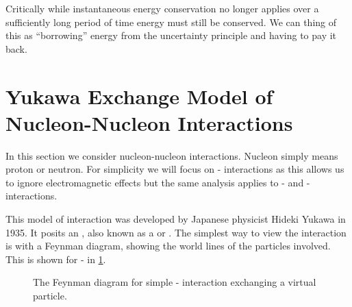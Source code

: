 \documentclass[fleqn]{NotesClass}
\begin{document}
    Critically while instantaneous energy conservation no longer applies over a sufficiently long period of time energy must still be conserved.
    We can thing of this as \enquote{borrowing} energy from the uncertainty principle and having to pay it back.
    
    \section{Yukawa Exchange Model of Nucleon-Nucleon Interactions}
    In this section we consider nucleon-nucleon interactions.
    Nucleon simply means proton or neutron.
    For simplicity we will focus on \Pn-\Pn{} interactions as this allows us to ignore electromagnetic effects but the same analysis applies to \Pp-\Pn{} and \Pp-\Pp{} interactions.
    
    This model of interaction was developed by Japanese physicist Hideki Yukawa in 1935.
    It posits an , also known as a  or .
    The simplest way to view the interaction is with a Feynman diagram, showing the world lines of the particles involved.
    This is shown for \Pn-\Pn{} in \cref{fig:n-n feynman diagram}.
    
    \begin{figure}
        \caption{The Feynman diagram for simple \Pn-\Pn{} interaction exchanging a virtual particle.}
        \label{fig:n-n feynman diagram}
    \end{figure}
    
\end{document}
